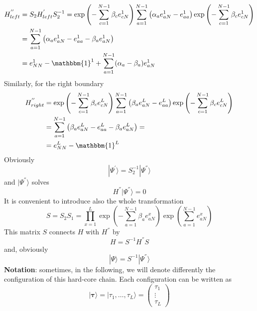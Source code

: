 \documentclass[10pt]{article}
\numberwithin{equation}{section}
\numberwithin{equation}{subsection}
\begin{document}
\begin{equation}
	\begin{split}
		H_{left}^{''}&=S_{2}H_{left}^{'}S_{2}^{-1}=\exp{\left(-\sum_{c=1}^{N-1}\beta_{c}e_{cN}^{1}\right)}\sum_{a=1}^{N-1}\left(\alpha_{a}e_{aN}^{1}-e_{aa}^{1}\right)\exp{\left(-\sum_{c=1}^{N-1}\beta_{c}e_{cN}^{1}\right)}
		\\&=
		\sum_{a=1}^{N-1}\left(\alpha_{a}e_{aN}^{1}-e_{aa}^{1}-\beta_{a}e_{aN}^{1}\right)
		\\&=
		e_{NN}^{1}-\mathbbm{1}^{1}+\sum_{a=1}^{N-1}(\alpha_{a}-\beta_{a})e_{aN}^{1}
	\end{split}
\end{equation}
Similarly, for the right boundary
\begin{equation}
	\begin{split}
			H_{right}^{''}&=\exp{\left(-\sum_{c=1}^{N-1}\beta_{c}e_{cN}^{L}\right)}\sum_{a=1}^{N-1}\left(\beta_{a}e_{aN}^{L}-e_{aa}^{L}\right)\exp{\left(-\sum_{c=1}^{N-1}\beta_{c}e_{cN}^{L}\right)}
			\\&=
			\sum_{a=1}^{N-1}\left(\beta_{a}e_{aN}^{L}-e_{aa}^{L}-\beta_{a}e_{aN}^{L}\right)=
			\\&=
			e_{NN}^{L}-\mathbbm{1}^{L}
	\end{split}
\end{equation}
Obviously
\begin{equation}\label{S2-Inverse}
	|\Psi^{'}\rangle = S_{2}^{-1}|\Psi^{''}\rangle
\end{equation}
and $|\Psi^{''}\rangle$ solves
\begin{equation}\label{steadyS-SECOND-def}
	H^{''}|\Psi^{''}\rangle=0
\end{equation}
It is convenient to introduce also the whole transformation
\begin{equation}\label{similarity}
	S=S_{2}S_{1}=\prod_{x=1}^{L}\exp{\left(-\sum_{a=1}^{N-1}\beta_{a}e_{aN}^{x}\right)}\exp{\left(\sum_{a=1}^{N-1}e_{aN}^{x}\right)}
\end{equation}
This matrix $S$ connects $H$ with $H^{''}$ by 
\begin{equation}
H=S^{-1}H^{''}S
\end{equation}
and, obviously
\begin{equation}
	|\Psi\rangle=S^{-1}|\Psi^{''}\rangle
\end{equation}
\textbf{Notation}: sometimes, in the following, we will denote differently the configuration of this hard-core chain. Each configuration can be written as
\begin{equation}\label{Tau-Notation}
	|\bm{\tau}\rangle=|\tau_{1},\ldots,\tau_{L}\rangle =\begin{pmatrix}
		\tau_{1}\\
		\vdots\\
		\tau_{L}
	\end{pmatrix}
\end{equation}
\end{document}
